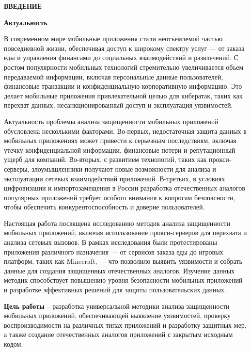 \newpage
\renewcommand{\contentsname}{\centerline{\large СОДЕРЖАНИЕ}}
\tableofcontents

\newpage
\begin{center}
  \textbf{\large ВВЕДЕНИЕ}
\end{center}


\textbf{Актуальность}

В современном мире мобильные приложения стали неотъемлемой частью повседневной жизни, обеспечивая доступ к широкому спектру услуг — от заказа еды и управления финансами до социальных взаимодействий и развлечений. С ростом популярности мобильных технологий стремительно увеличивается объем передаваемой информации, включая персональные данные пользователей, финансовые транзакции и конфиденциальную корпоративную информацию. Это делает мобильные приложения привлекательной целью для кибератак, таких как перехват данных, несанкционированный доступ и эксплуатация уязвимостей.

Актуальность проблемы анализа защищенности мобильных приложений обусловлена несколькими факторами. Во-первых, недостаточная защита данных в мобильных приложениях может привести к серьезным последствиям, включая утечку конфиденциальной информации, финансовые потери и репутационный ущерб для компаний. Во-вторых, с развитием технологий, таких как прокси-серверы, злоумышленники получают новые возможности для анализа и эксплуатации сетевых взаимодействий приложений. В-третьих, в условиях цифровизации и импортозамещения в России разработка отечественных аналогов популярных приложений требует особого внимания к вопросам безопасности, чтобы обеспечить конкурентоспособность и доверие пользователей.

Настоящая работа посвящена исследованию методик анализа защищенности мобильных приложений, включая использование прокси-серверов для перехвата и анализа сетевых вызовов. В рамках исследования были протестированы приложения различного назначения — от сервисов заказа еды до игровых платформ, таких как Minecraft, — что позволило выявить уязвимости и собрать данные для создания защищенных отечественных аналогов. Изучение данных методик способствует повышению уровня безопасности мобильных приложений и разработке эффективных решений для защиты пользовательских данных.

\newpage

\textbf{Цель работы} -- разработка универсальной методики анализа защищенности мобильных приложений, обеспечивающей выявление уязвимостей, проверку воспроизводимости на различных типах приложений и разработку защитных мер, а также создание отечественных аналогов приложений с закрытым исходным кодом.


